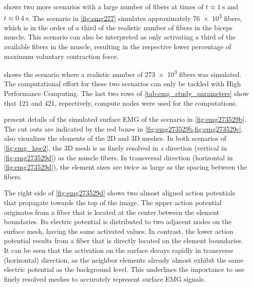  shows two more scenarios with a large number of fibers at times of $t\approx \SI{1}{\s}$ and $t\approx \SI{0.4}{\s}$. The scenario in \cref{fig:emg277} simulates approximately \num{76e3} fibers, which is in the order of a third of the realistic number of fibers in the biceps muscle. 
This scenario can also be interpreted as only activating a third of the available fibers in the muscle, resulting in the respective lower percentage of maximum voluntary contraction force.

 shows the scenario where a realistic number of \num{273e3} fibers was simulated. The computational effort for these two scenarios can only be tackled with High Performance Computing. The last two rows of \cref{tab:emg_study_parameters} show that 121 and 421, repectively, compute nodes were used for the computations.

 present details of the simulated surface EMG of the scenario in \cref{fig:emg273529b}. The cut outs are indicated by the red boxes in \cref{fig:emg273529b,fig:emg273529c}.  also visualizes the elements of the 2D and 3D meshes. In both scenarios of \cref{fig:emg_hpc2}, the 3D mesh is as finely resolved in $z$ direction (vertical in \cref{fig:emg273529d}) as the muscle fibers. In transversal direction (horizontal in \cref{fig:emg273529d}), the element sizes are twice as large as the spacing between the fibers. 

The right side of \cref{fig:emg273529d} shows two almost aligned action potentials that propagate towards the top of the image. The upper action potential originates from a fiber that is located at the center between the element boundaries. Its electric potential is distributed to two adjacent nodes on the surface mesh, having the same activated values.
In contrast, the lower action potential results from a fiber that is directly located on the element boundaries. It can be seen that the activation on the surface decays rapidly in transverse (horizontal) direction, as the neighbor elements already almost exhibit the same electric potential as the background level. This underlines the importance to use finely resolved meshes to accurately represent surface EMG signals.


